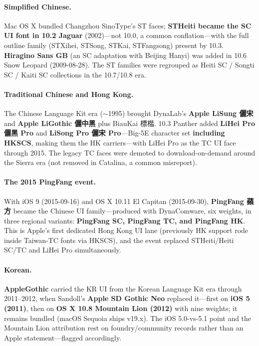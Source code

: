 \documentclass[10pt,a4paper]{article}
\begin{document}
\paragraph{Simplified Chinese.} Mac OS X bundled Changzhou SinoType's ST faces;
\textbf{STHeiti became the SC UI font in 10.2 Jaguar} (2002)---not 10.0, a common
conflation---with the full outline family (STXihei, STSong, STKai, STFangsong) present
by 10.3. \textbf{Hiragino Sans GB} (an SC adaptation with Beijing Hanyi) was added in
10.6 Snow Leopard (2009-08-28). The ST families were regrouped as Heiti SC / Songti SC
/ Kaiti SC collections in the 10.7/10.8 era.\cite{ca-chinesemac,ca-cjklist}

\paragraph{Traditional Chinese and Hong Kong.} The Chinese Language Kit era
($\sim$1995) brought DynaLab's \textbf{Apple LiSung 儷宋} and \textbf{Apple LiGothic
儷中黑} plus BiauKai 標楷. 10.3 Panther added \textbf{LiHei Pro 儷黑 Pro} and
\textbf{LiSong Pro 儷宋 Pro}---Big-5E character set \textbf{including HKSCS}, making them
the HK carriers---with LiHei Pro as the TC UI face through 2015. The legacy TC faces
were demoted to download-on-demand around the Sierra era (not removed in Catalina, a
common misreport).\cite{ca-chinesemac,ca-sierra}

\paragraph{The 2015 PingFang event.} With iOS 9 (2015-09-16) and OS X 10.11 El Capitan
(2015-09-30), \textbf{PingFang 蘋方} became the Chinese UI family---produced with
DynaComware, six weights, in three regional variants: \textbf{PingFang SC, PingFang
TC, and PingFang HK}. This is Apple's first dedicated Hong Kong UI lane (previously HK
support rode inside Taiwan-TC fonts via HKSCS), and the event replaced STHeiti/Heiti
SC/TC and LiHei Pro simultaneously.\cite{ca-pingfang,ca-pingfang-2,ca-chinesemac11}

\paragraph{Korean.} \textbf{AppleGothic} carried the KR UI from the Korean Language Kit
era through 2011--2012, when Sandoll's \textbf{Apple SD Gothic Neo} replaced it---first
on \textbf{iOS 5 (2011)}, then on \textbf{OS X 10.8 Mountain Lion (2012)} with nine
weights; it remains bundled (macOS Sequoia ships v19.x). The iOS 5.0-vs-5.1 point and
the Mountain Lion attribution rest on foundry/community records rather than an Apple
statement---flagged accordingly.\cite{ca-korean,ca-korean-2}
\end{document}
